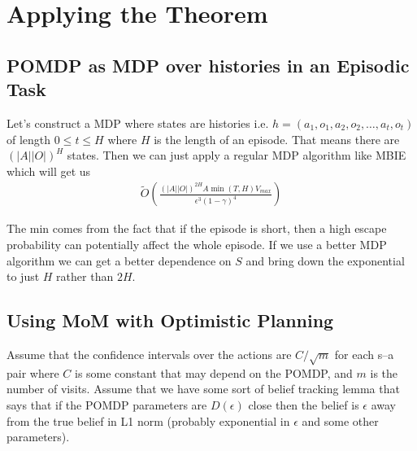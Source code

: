 \documentclass[10pt,english]{article}
\begin{document}
\section{Applying the Theorem}

\subsection{POMDP as MDP over histories in an Episodic Task}

Let's construct a MDP where states are histories i.e. $h=(a_1,o_1,a_2,o_2,\dots,a_t,o_t)$ of length $0\leq t \leq H$ where $H$ is the length of an episode. That means there are $(|A||O|)^H$ states. Then we can just apply a regular MDP algorithm like MBIE which will get us
\begin{align}
\tilde{O}\left( \frac{(|A||O|)^{2H}A\min(T,H)V_{max}}{\epsilon^3(1-\gamma)^4} \right)
\end{align}

The min comes from the fact that if the episode is short, then a high escape probability can potentially affect the whole episode. If we use a better MDP algorithm we can get a better dependence on $S$ and bring down the exponential to just $H$ rather than $2H$.

\subsection{Using MoM with Optimistic Planning}

Assume that the confidence intervals over the actions are $C/\sqrt{m}$ for each s--a pair where $C$ is some constant that may depend on the POMDP, and $m$ is the number of visits. Assume that we have some sort of belief tracking lemma that says that if the POMDP parameters are $D(\epsilon)$ close then the belief is $\epsilon$ away from the true belief in L1 norm (probably exponential in $\epsilon$ and some other parameters).
\end{document}
